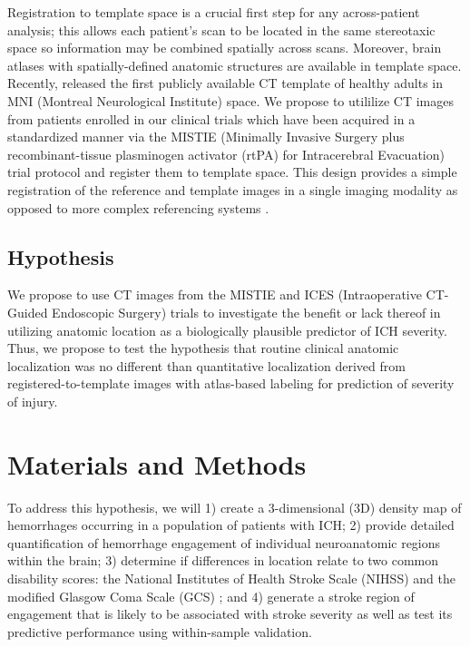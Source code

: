 \documentclass[10pt]{article}\usepackage[]{graphicx}\usepackage[]{color}
\begin{document}
Registration to template space is a crucial first step for any across-patient analysis; this allows each patient's scan to be located in the same stereotaxic space so information may be combined spatially across scans.  Moreover, brain atlases with spatially-defined anatomic structures are available in template space.
Recently, \citet{rorden_age-specific_2012} released the first publicly available CT template of healthy adults in MNI (Montreal Neurological Institute) space.  We propose to utililize CT images from patients enrolled in our clinical trials which have been acquired in a standardized manner via the MISTIE (Minimally Invasive Surgery plus recombinant-tissue plasminogen activator (rtPA) for Intracerebral Evacuation) trial protocol and register them to template space.  This design provides a simple registration of the reference and template images in a single imaging modality as opposed to more complex referencing systems \citep{solomon_user-friendly_2007, li_registration_2010, princich_rapid_2013}.


\subsection{Hypothesis}

We propose to use CT images from the MISTIE and ICES (Intraoperative CT-Guided Endoscopic Surgery) trials to investigate the benefit or lack thereof in utilizing anatomic location as a biologically plausible predictor of ICH severity.  Thus, we propose to test the hypothesis that routine clinical anatomic localization was no different than quantitative localization derived from registered-to-template images with atlas-based labeling for prediction of severity of injury.

\newpage

\section{Materials and Methods}

To address this hypothesis, we will 1) create a 3-dimensional (3D) density map of hemorrhages occurring in a population of patients with ICH; 2) provide detailed quantification of hemorrhage engagement of individual neuroanatomic regions within the brain; 3) determine if differences in location relate to two common disability scores: the National Institutes of Health Stroke Scale (NIHSS) \citep{brott_measurements_1989} 
and the modified Glasgow Coma Scale (GCS) \citep{teasdale_assessment_1974, teasdale_assessment_1976}; and 4) generate a stroke region of engagement that is likely to be associated with stroke severity as well as test its predictive performance using within-sample validation.
\end{document}
